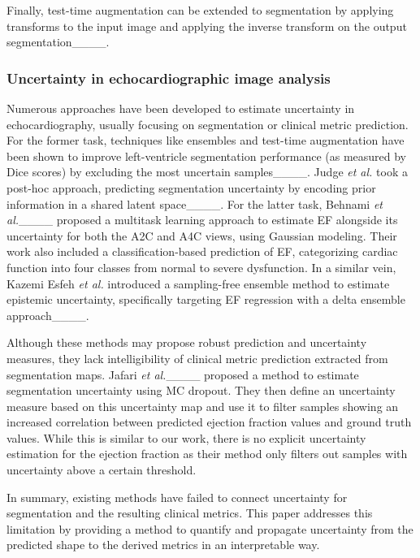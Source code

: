 Finally, test-time augmentation can be extended to segmentation by applying transforms to the input image and applying the inverse transform on the output segmentation____. 


\subsubsection{Uncertainty in echocardiographic image analysis}

Numerous approaches have been developed to estimate uncertainty in echocardiography, usually focusing on segmentation or clinical metric prediction. For the former task, techniques like ensembles and test-time augmentation have been shown to improve left-ventricle segmentation performance (as measured by Dice scores) by excluding the most uncertain samples____. Judge \textit{et al.} took a post-hoc approach, predicting segmentation uncertainty by encoding prior information in a shared latent space____. For the latter task, Behnami \textit{et al.}____ proposed a multitask learning approach to estimate EF alongside its uncertainty for both the A2C and A4C views, using Gaussian modeling. Their work also included a classification-based prediction of EF, categorizing cardiac function into four classes from normal to severe dysfunction. In a similar vein, Kazemi Esfeh \textit{et al.} introduced a sampling-free ensemble method to estimate epistemic uncertainty, specifically targeting EF regression with a delta ensemble approach____.

Although these methods may propose robust prediction and uncertainty measures, they lack intelligibility of clinical metric prediction extracted from segmentation maps. Jafari \textit{et al.}____ proposed a method to estimate segmentation uncertainty using MC dropout. They then define an uncertainty measure based on this uncertainty map and use it to filter samples showing an increased correlation between predicted ejection fraction values and ground truth values. While this is similar to our work, there is no explicit uncertainty estimation for the ejection fraction as their method only filters out samples with uncertainty above a certain threshold. 

In summary, existing methods have failed to connect uncertainty for segmentation and the resulting clinical metrics. This paper addresses this limitation by providing a method to quantify and propagate uncertainty from the predicted shape to the derived metrics in an interpretable way.



